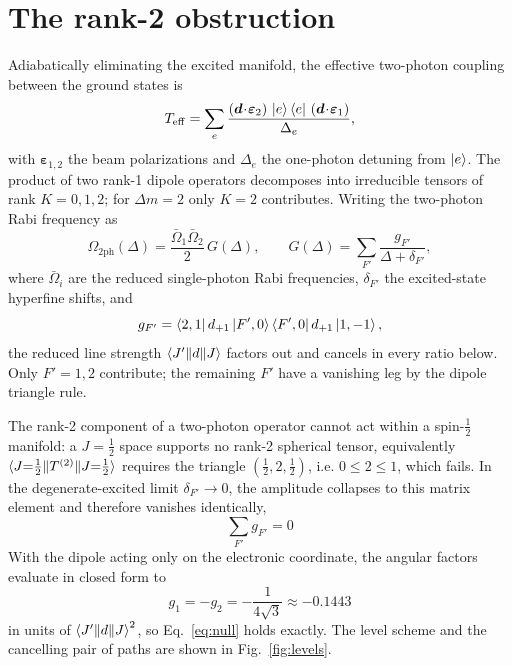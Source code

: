 \documentclass[aps,pra,reprint,amsmath,amssymb,superscriptaddress,floatfix]{revtex4-2}
\newcommand{\Dm}{\Delta m}
\begin{document}
\section{The rank-2 obstruction}\label{sec:obstruction}
Adiabatically eliminating the excited manifold, the effective two-photon coupling between the
ground states is
\begin{equation}
T_{\mathrm{eff}}=\sum_e\frac{(\bm d\!\cdot\!\bm\varepsilon_2)\,\ket{e}\bra{e}\,(\bm d\!\cdot\!\bm\varepsilon_1)}{\Delta_e},
\end{equation}
with $\bm\varepsilon_{1,2}$ the beam polarizations and $\Delta_e$ the one-photon detuning from
$\ket{e}$. The product of two rank-1 dipole operators decomposes into irreducible tensors of rank
$K=0,1,2$; for $\Dm=2$ only $K=2$ contributes. Writing the two-photon Rabi frequency as
\begin{equation}\label{eq:omega2ph}
\Omega_{2\mathrm{ph}}(\Delta)=\frac{\bar\Omega_1\bar\Omega_2}{2}\,G(\Delta),\qquad
G(\Delta)=\sum_{F'}\frac{g_{F'}}{\Delta+\delta_{F'}},
\end{equation}
where $\bar\Omega_i$ are the reduced single-photon Rabi frequencies, $\delta_{F'}$ the
excited-state hyperfine shifts, and
\begin{equation}
g_{F'}=\bra{2,1}d_{+1}\ket{F',0}\bra{F',0}d_{+1}\ket{1,-1},
\end{equation}
the reduced line strength $\braket{J'\Vert d\Vert J}$ factors out and cancels in every ratio below.
Only $F'=1,2$ contribute; the remaining $F'$ have a vanishing leg by the dipole triangle rule.

The rank-2 component of a two-photon operator cannot act within a spin-$\tfrac12$ manifold: a
$J=\tfrac12$ space supports no rank-2 spherical tensor, equivalently
$\braket{J{=}\tfrac12\Vert T^{(2)}\Vert J{=}\tfrac12}$ requires the triangle $(\tfrac12,2,\tfrac12)$,
i.e. $0\le2\le1$, which fails. In the degenerate-excited limit $\delta_{F'}\!\to\!0$, the amplitude
collapses to this matrix element and therefore vanishes identically,
\begin{equation}\label{eq:null}
\boxed{\;\sum_{F'} g_{F'} = 0\;}
\end{equation}
With the dipole acting only on the electronic coordinate, the angular factors evaluate in closed
form to
\begin{equation}
g_{1}=-g_{2}=-\frac{1}{4\sqrt3}\approx-0.1443
\end{equation}
in units of $\braket{J'\Vert d\Vert J}^2$, so Eq.~\eqref{eq:null} holds exactly. The level scheme
and the cancelling pair of paths are shown in Fig.~\ref{fig:levels}.
\end{document}
